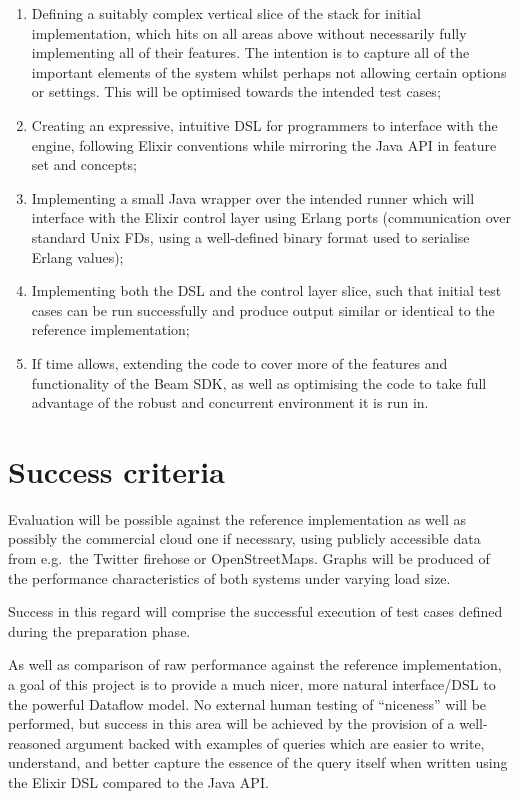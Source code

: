 \begin{enumerate}
	\item Defining a suitably complex vertical slice of the stack for initial implementation, which hits on all areas above without necessarily fully implementing all of their features. The intention is to capture all of the important elements of the system whilst perhaps not allowing certain options or settings. This will be optimised towards the intended test cases;
	\item Creating an expressive, intuitive DSL for programmers to interface with the engine, following Elixir conventions while mirroring the Java API in feature set and concepts;
	\item Implementing a small Java wrapper over the intended runner which will interface with the Elixir control layer using Erlang ports (communication over standard Unix FDs, using a well-defined binary format used to serialise Erlang values);
	\item Implementing both the DSL and the control layer slice, such that initial test cases can be run successfully and produce output similar or identical to the reference implementation;
	\item If time allows, extending the code to cover more of the features and functionality of the Beam SDK, as well as optimising the code to take full advantage of the robust and concurrent environment it is run in.
\end{enumerate}

\section*{Success criteria}

Evaluation will be possible against the reference implementation as well as possibly the commercial cloud one if necessary, using publicly accessible data from e.g.\ the Twitter firehose or OpenStreetMaps. Graphs will be produced of the performance characteristics of both systems under varying load size.

Success in this regard will comprise the successful execution of test cases defined during the preparation phase.

As well as comparison of raw performance against the reference implementation, a goal of this project is to provide a much nicer, more natural interface/DSL to the powerful Dataflow model. No external human testing of ``niceness'' will be performed, but success in this area will be achieved by the provision of a well-reasoned argument backed with examples of queries which are easier to write, understand, and better capture the essence of the query itself when written using the Elixir DSL compared to the Java API.


